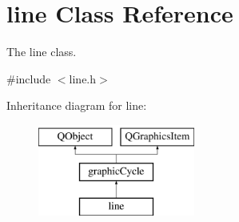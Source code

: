 \hypertarget{classline}{}\section{line Class Reference}
\label{classline}


The line class.  




{\ttfamily \#include $<$line.\+h$>$}

Inheritance diagram for line\+:\begin{figure}[H]
\begin{center}
\leavevmode
\includegraphics[height=3.000000cm]{classline}
\end{center}
\end{figure}
